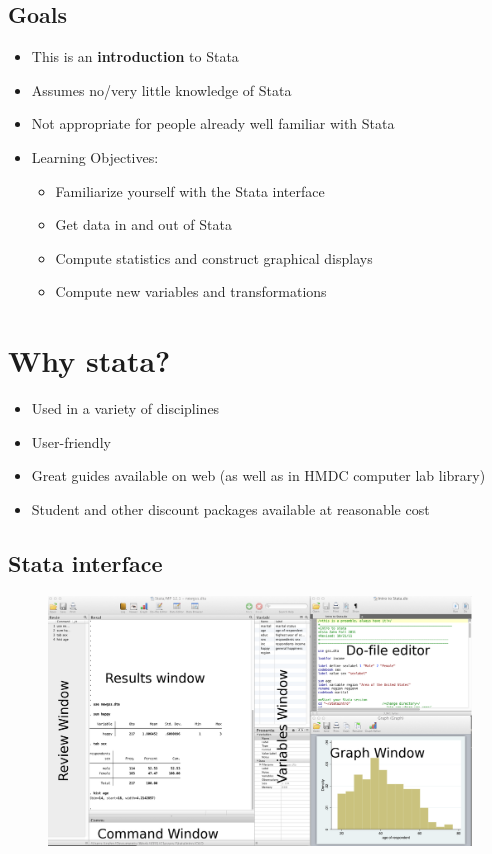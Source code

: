 \documentclass[]{book}
\providecommand{\tightlist}{%
  \setlength{\itemsep}{0pt}\setlength{\parskip}{0pt}}
\begin{document}
\subsection{Goals}\label{goals-6}

\begin{itemize}
\tightlist
\item
  This is an \textbf{introduction} to Stata
\item
  Assumes no/very little knowledge of Stata
\item
  Not appropriate for people already well familiar with Stata
\item
  Learning Objectives:

  \begin{itemize}
  \tightlist
  \item
    Familiarize yourself with the Stata interface
  \item
    Get data in and out of Stata
  \item
    Compute statistics and construct graphical displays
  \item
    Compute new variables and transformations
  \end{itemize}
\end{itemize}

\section{Why stata?}\label{why-stata}

\begin{itemize}
\tightlist
\item
  Used in a variety of disciplines
\item
  User-friendly
\item
  Great guides available on web (as well as in HMDC computer lab
  library)
\item
  Student and other discount packages available at reasonable cost
\end{itemize}

\subsection{Stata interface}\label{stata-interface}

\begin{figure}
\centering
\includegraphics{Stata/StataIntro/images/StataInterface.png}
\caption{}
\end{figure}
\end{document}
